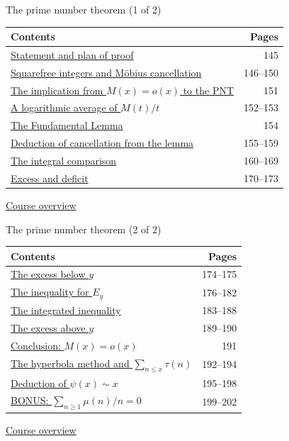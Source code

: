 \documentclass[aspectratio=169,11pt]{beamer}
\begin{document}
\begin{frame}{The prime number theorem (1 of 2)}
\small\renewcommand{\arraystretch}{1.35}
\begin{tabular}{p{}r}\textbf{Contents}&\textbf{Pages}\\\midrule
\hyperlink{Navigation145}{Statement and plan of proof}&145\\
\hyperlink{Navigation146}{Squarefree integers and M\"obius cancellation}&146--150\\
\hyperlink{Navigation151}{The implication from $M(x)=o(x)$ to the PNT}&151\\
\hyperlink{Navigation152}{A logarithmic average of $M(t)/t$}&152--153\\
\hyperlink{Navigation154}{The Fundamental Lemma}&154\\
\hyperlink{Navigation155}{Deduction of cancellation from the lemma}&155--159\\
\hyperlink{Navigation160}{The integral comparison}&160--169\\
\hyperlink{Navigation170}{Excess and deficit}&170--173\\
\end{tabular}\par\medskip\hyperlink{overview}{\color{teal}Course overview}\end{frame}


\begin{frame}{The prime number theorem (2 of 2)}
\small\renewcommand{\arraystretch}{1.35}
\begin{tabular}{p{}r}\textbf{Contents}&\textbf{Pages}\\\midrule
\hyperlink{Navigation174}{The excess below $y$}&174--175\\
\hyperlink{Navigation176}{The inequality for $E_y$}&176--182\\
\hyperlink{Navigation183}{The integrated inequality}&183--188\\
\hyperlink{Navigation189}{The excess above $y$}&189--190\\
\hyperlink{Navigation191}{Conclusion: $M(x)=o(x)$}&191\\
\hyperlink{Navigation192}{The hyperbola method and $\sum_{n\le x}\tau(n)$}&192--194\\
\hyperlink{Navigation195}{Deduction of $\psi(x)\sim x$}&195--198\\
\hyperlink{Navigation199}{BONUS: $\sum_{n\ge1}\mu(n)/n=0$}&199--202\\
\end{tabular}\par\medskip\hyperlink{overview}{\color{teal}Course overview}\end{frame}
\end{document}
